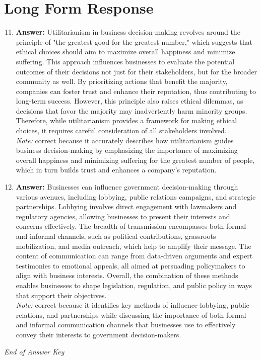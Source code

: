 \documentclass[12pt]{article}
\begin{document}
\section*{Long Form Response}
\begin{enumerate}[label=\arabic*.]
\setcounter{enumi}{10}
\item \textbf{Answer:} Utilitarianism in business decision-making revolves around the principle of "the greatest good for the greatest number," which suggests that ethical choices should aim to maximize overall happiness and minimize suffering. This approach influences businesses to evaluate the potential outcomes of their decisions not just for their stakeholders, but for the broader community as well. By prioritizing actions that benefit the majority, companies can foster trust and enhance their reputation, thus contributing to long-term success. However, this principle also raises ethical dilemmas, as decisions that favor the majority may inadvertently harm minority groups. Therefore, while utilitarianism provides a framework for making ethical choices, it requires careful consideration of all stakeholders involved.
\\ \textit{Note:} correct because it accurately describes how utilitarianism guides business decision-making by emphasizing the importance of maximizing overall happiness and minimizing suffering for the greatest number of people, which in turn builds trust and enhances a company's reputation.
\item \textbf{Answer:} Businesses can influence government decision-making through various avenues, including lobbying, public relations campaigns, and strategic partnerships. Lobbying involves direct engagement with lawmakers and regulatory agencies, allowing businesses to present their interests and concerns effectively. The breadth of transmission encompasses both formal and informal channels, such as political contributions, grassroots mobilization, and media outreach, which help to amplify their message. The content of communication can range from data-driven arguments and expert testimonies to emotional appeals, all aimed at persuading policymakers to align with business interests. Overall, the combination of these methods enables businesses to shape legislation, regulation, and public policy in ways that support their objectives.
\\ \textit{Note:} correct because it identifies key methods of influence-lobbying, public relations, and partnerships-while discussing the importance of both formal and informal communication channels that businesses use to effectively convey their interests to government decision-makers.
\end{enumerate}

\vfill
\noindent\textit{End of Answer Key}
\end{document}
